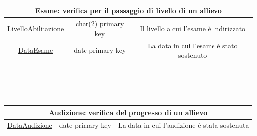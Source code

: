 \documentclass[11pt]{article}
\begin{document}
		\\\\\\
		\begin{tabular}{|c|c|c|}
			\hline
			\multicolumn{3}{|c|}{\textbf{Esame}: verifica per il passaggio di livello di un allievo}\\
			\hline
			\underline{LivelloAbilitazione} & char(2) primary key & Il livello a cui l'esame è indirizzato\\
			\hline
			\underline{DataEsame} & date primary key & La data in cui l'esame è stato sostenuto\\
			\hline
		\end{tabular}
		\\\\\\
		\begin{tabular}{|c|c|c|}
			\hline
			\multicolumn{3}{|c|}{\textbf{Audizione}: verifica del progresso di un allievo}\\
			\hline
			\underline{DataAudizione} & date primary key & La data in cui l'audizione è stata sostenuta\\
			\hline
		\end{tabular}
\end{document}

